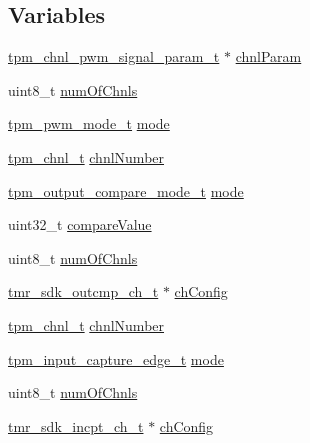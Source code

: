 \subsection*{Variables}
\begin{DoxyCompactItemize}
\item 
\mbox{\hyperlink{group__tpm_ga19383e0a3baf4033a37e96df9016ab1c}{tpm\+\_\+chnl\+\_\+pwm\+\_\+signal\+\_\+param\+\_\+t}} $\ast$ \mbox{\hyperlink{group__struct__group_ga7a88598e04539adadd8553ef53cbc240}{chnl\+Param}}
\item 
uint8\+\_\+t \mbox{\hyperlink{group__struct__group_ga04fc2b7b992637ebdbf5567107730087}{num\+Of\+Chnls}}
\item 
\mbox{\hyperlink{group__tpm_ga3575f319c9fbc1aa574a1054c14e7dab}{tpm\+\_\+pwm\+\_\+mode\+\_\+t}} \mbox{\hyperlink{group__struct__group_ga4c09362008685312f26edfb50458aad6}{mode}}
\item 
\mbox{\hyperlink{group__tpm_gacda6962369e014c8ac72d1b58b224deb}{tpm\+\_\+chnl\+\_\+t}} \mbox{\hyperlink{group__struct__group_gaddc94dba6576d0b40cd83b493968a2e4}{chnl\+Number}}
\item 
\mbox{\hyperlink{group__tpm_gae76bda507d28f3c302f4cdfeee61ba5e}{tpm\+\_\+output\+\_\+compare\+\_\+mode\+\_\+t}} \mbox{\hyperlink{group__struct__group_gaf5112494d3efec9f7706606b8405a35f}{mode}}
\item 
uint32\+\_\+t \mbox{\hyperlink{group__struct__group_gae39f1dfd1bc42feaeb879d5d2eb2249b}{compare\+Value}}
\item 
uint8\+\_\+t \mbox{\hyperlink{group__struct__group_ga04fc2b7b992637ebdbf5567107730087}{num\+Of\+Chnls}}
\item 
\mbox{\hyperlink{structtmr__sdk__outcmp__ch__t}{tmr\+\_\+sdk\+\_\+outcmp\+\_\+ch\+\_\+t}} $\ast$ \mbox{\hyperlink{group__struct__group_ga5757dff16c6d1f7f36e57e4c9cf0ddbf}{ch\+Config}}
\item 
\mbox{\hyperlink{group__tpm_gacda6962369e014c8ac72d1b58b224deb}{tpm\+\_\+chnl\+\_\+t}} \mbox{\hyperlink{group__struct__group_gaddc94dba6576d0b40cd83b493968a2e4}{chnl\+Number}}
\item 
\mbox{\hyperlink{group__tpm_ga5bcbd71358fe69e564786631827f7db1}{tpm\+\_\+input\+\_\+capture\+\_\+edge\+\_\+t}} \mbox{\hyperlink{group__struct__group_ga72eaddb2461dc4c31bdd3febd201b9aa}{mode}}
\item 
uint8\+\_\+t \mbox{\hyperlink{group__struct__group_ga04fc2b7b992637ebdbf5567107730087}{num\+Of\+Chnls}}
\item 
\mbox{\hyperlink{structtmr__sdk__incpt__ch__t}{tmr\+\_\+sdk\+\_\+incpt\+\_\+ch\+\_\+t}} $\ast$ \mbox{\hyperlink{group__struct__group_ga54e0c6a0ab1806a999058d00958e42d2}{ch\+Config}}

\end{DoxyCompactItemize}
